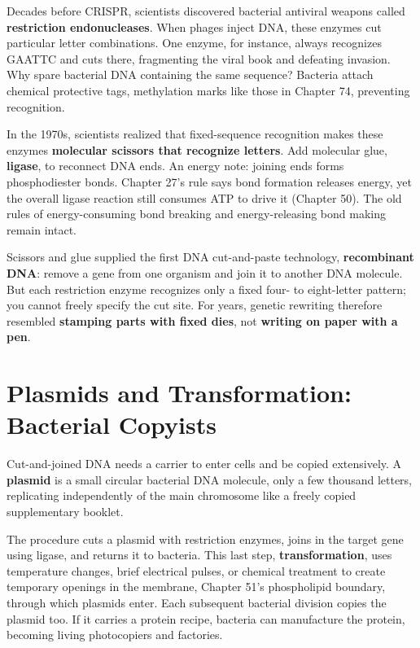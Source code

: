 Decades before CRISPR, scientists discovered bacterial antiviral weapons called \textbf{restriction endonucleases}. When phages inject DNA, these enzymes cut particular letter combinations. One enzyme, for instance, always recognizes GAATTC and cuts there, fragmenting the viral book and defeating invasion. Why spare bacterial DNA containing the same sequence? Bacteria attach chemical protective tags, methylation marks like those in Chapter 74, preventing recognition.

In the 1970s, scientists realized that fixed-sequence recognition makes these enzymes \textbf{molecular scissors that recognize letters}. Add molecular glue, \textbf{ligase}, to reconnect DNA ends. An energy note: joining ends forms phosphodiester bonds. Chapter 27's rule says bond formation releases energy, yet the overall ligase reaction still consumes ATP to drive it (Chapter 50). The old rules of energy-consuming bond breaking and energy-releasing bond making remain intact.

Scissors and glue supplied the first DNA cut-and-paste technology, \textbf{recombinant DNA}: remove a gene from one organism and join it to another DNA molecule. But each restriction enzyme recognizes only a fixed four- to eight-letter pattern; you cannot freely specify the cut site. For years, genetic rewriting therefore resembled \textbf{stamping parts with fixed dies}, not \textbf{writing on paper with a pen}.

\section{Plasmids and Transformation: Bacterial Copyists}

Cut-and-joined DNA needs a carrier to enter cells and be copied extensively. A \textbf{plasmid} is a small circular bacterial DNA molecule, only a few thousand letters, replicating independently of the main chromosome like a freely copied supplementary booklet.

The procedure cuts a plasmid with restriction enzymes, joins in the target gene using ligase, and returns it to bacteria. This last step, \textbf{transformation}, uses temperature changes, brief electrical pulses, or chemical treatment to create temporary openings in the membrane, Chapter 51's phospholipid boundary, through which plasmids enter. Each subsequent bacterial division copies the plasmid too. If it carries a protein recipe, bacteria can manufacture the protein, becoming living photocopiers and factories.

